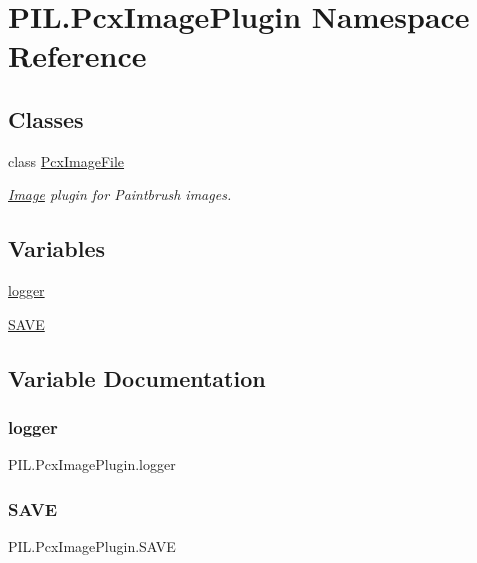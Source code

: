 \hypertarget{namespacePIL_1_1PcxImagePlugin}{}\section{P\+I\+L.\+Pcx\+Image\+Plugin Namespace Reference}
\label{namespacePIL_1_1PcxImagePlugin}
\subsection*{Classes}
\begin{DoxyCompactItemize}
\item 
class \hyperlink{classPIL_1_1PcxImagePlugin_1_1PcxImageFile}{Pcx\+Image\+File}
\begin{DoxyCompactList}\small\item\em \hyperlink{namespacePIL_1_1Image}{Image} plugin for Paintbrush images. \end{DoxyCompactList}\end{DoxyCompactItemize}
\subsection*{Variables}
\begin{DoxyCompactItemize}
\item 
\hyperlink{namespacePIL_1_1PcxImagePlugin_afbb000d2fef0f290a98db22d5eadcb67}{logger}
\item 
\hyperlink{namespacePIL_1_1PcxImagePlugin_a412fb7ce41750a8457c40a1cd4a9105b}{S\+A\+VE}
\end{DoxyCompactItemize}


\subsection{Variable Documentation}
\mbox{\label{namespacePIL_1_1PcxImagePlugin_afbb000d2fef0f290a98db22d5eadcb67}} 
\subsubsection{\texorpdfstring{logger}{logger}}
{\footnotesize\ttfamily P\+I\+L.\+Pcx\+Image\+Plugin.\+logger}

\mbox{\label{namespacePIL_1_1PcxImagePlugin_a412fb7ce41750a8457c40a1cd4a9105b}} 
\subsubsection{\texorpdfstring{S\+A\+VE}{SAVE}}
{\footnotesize\ttfamily P\+I\+L.\+Pcx\+Image\+Plugin.\+S\+A\+VE}

